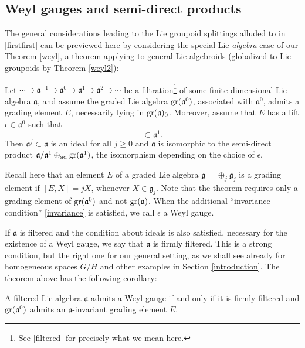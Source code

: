 \documentclass[leqno,12pt]{amsart} %
\begin{document}
\subsection{Weyl gauges and semi-direct products}\label{intro_prolong}
The general considerations leading to the Lie groupoid splittings alluded to in
\ref{firstfirst} can be previewed here by considering the special Lie {\em algebra} case
of our Theorem \ref{weyl}, a theorem applying to general Lie algebroids (globalized to Lie
groupoids by Theorem \ref{weyl2}):
\begin{theorem}
  Let
  $\cdots \supset {\mathfrak a}^{-1} \supset {\mathfrak a}^0 \supset {\mathfrak a}^1
  \supset {\mathfrak a}^2 \supset \cdots$ be a filtration\footnote{See \ref{filtered} for
    precisely what we mean here.} of some finite-dimensional Lie algebra ${\mathfrak a} $,
  and assume the graded Lie algebra $\operatorname{\operatorname{gr}}({\mathfrak a}^0)$, associated with
  ${\mathfrak a}^0$, admits a grading element $E$, necessarily lying in
  $\operatorname{\operatorname{gr}}({\mathfrak a})_0$.  Moreover, assume that $E $ has a lift
  $\epsilon \in {\mathfrak a}^0$ such that
  \begin{equation}
    [{\mathfrak a}, \epsilon] \subset {\mathfrak a}^1.\label{invariance}
  \end{equation}
  Then ${\mathfrak a}^j\subset {\mathfrak a}$ is an ideal for all $j \ge 0$ and
  ${\mathfrak a}$ is isomorphic to the semi-direct product
  ${\mathfrak a}/{\mathfrak a}^1 \oplus_{\operatorname{ad}}\operatorname{\operatorname{gr}}({\mathfrak a}^1)$, the
  isomorphism depending on the choice of $\epsilon $.
\end{theorem}
\noindent%
Recall here that an element $E$ of a graded Lie algebra
${\mathfrak g}=\oplus_j {\mathfrak g}_j $ is a {\df grading element} if $[E , X] = j X$,
whenever $X \in {\mathfrak g}_j$. Note that the theorem requires only a grading element of
$\operatorname{\operatorname{gr}}({\mathfrak a}^0)$ and not $\operatorname{\operatorname{gr}}({\mathfrak a})$. When the additional
``invariance condition'' \eqref{invariance} is satisfied, we call $\epsilon $ a {\df Weyl
  gauge}.

If ${\mathfrak a} $ is filtered and the condition about ideals is also satisfied,
necessary for the existence of a Weyl gauge, we say that ${\mathfrak a} $ is {\df firmly
  filtered}. This is a strong condition, but the right one for our general setting, as we
shall see already for homogeneous spaces $G/H$ and other examples in Section
\ref{introduction}. The theorem above has the following corollary:
\begin{aside}
  A filtered Lie algebra ${\mathfrak a}$ admits a Weyl gauge if and only if it is firmly
  filtered and $\operatorname{\operatorname{gr}}({\mathfrak a}^0)$ admits an ${\mathfrak a}$-invariant grading
  element $E$.
\end{aside}
\end{document}
